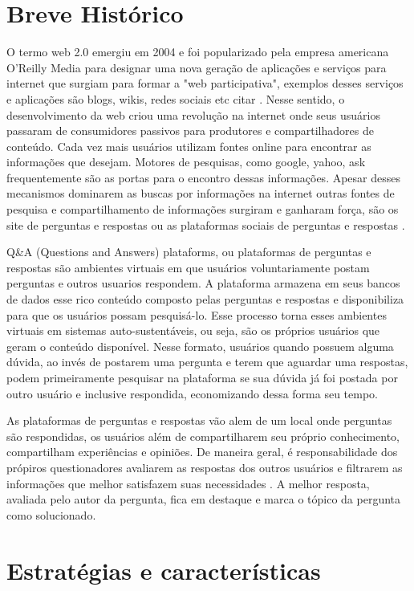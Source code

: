 \section{Breve Histórico}%

O termo web 2.0 emergiu em 2004 e foi popularizado pela empresa americana O'Reilly Media para designar uma nova geração de aplicações e serviços para internet
 que surgiam para formar a "web participativa", exemplos desses serviços e aplicações são  blogs, wikis, redes sociais etc citar \cite{madden2006riding}.  Nesse sentido,
 o desenvolvimento da web criou uma revolução na internet onde  seus usuários passaram de consumidores passivos  para produtores e compartilhadores de conteúdo. 
Cada vez mais usuários utilizam fontes online para encontrar as informações que desejam. Motores de pesquisas, como google, yahoo, ask frequentemente são as portas
 para o encontro dessas informações. Apesar desses mecanismos dominarem as buscas por informações na internet outras fontes de pesquisa e compartilhamento de informações
 surgiram e ganharam força, são os site de perguntas e respostas ou as plataformas sociais de perguntas e respostas \cite{shah2008explorin}.

Q\&A (Questions and Answers) plataforms, ou plataformas de perguntas e respostas são ambientes virtuais em que usuários voluntariamente postam perguntas e outros usuarios respondem.
 A plataforma armazena em seus bancos de dados esse rico conteúdo composto pelas perguntas e respostas e disponibiliza para que os usuários possam pesquisá-lo. Esse processo torna
 esses ambientes virtuais em sistemas auto-sustentáveis, ou seja, são os próprios usuários que geram o conteúdo disponível. Nesse formato, usuários quando possuem alguma dúvida, 
 ao invés de postarem uma pergunta e terem que aguardar uma respostas, podem primeiramente pesquisar na plataforma se sua dúvida já foi postada por outro usuário e inclusive respondida,
 economizando dessa forma seu tempo.
 
As plataformas de perguntas e respostas vão alem de um local onde perguntas são respondidas, os usuários além de compartilharem seu próprio conhecimento, compartilham experiências e opiniões. De maneira geral, é responsabilidade dos
 própiros questionadores avaliarem as respostas dos outros usuários e filtrarem as informações que melhor satisfazem suas necessidades \cite{kim2007best}. 
 A melhor resposta, avaliada pelo autor da pergunta, fica em destaque e marca o tópico da pergunta como solucionado.

\section{Estratégias e características}%

